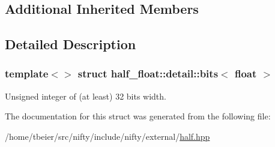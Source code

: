 \subsection*{Additional Inherited Members}


\subsection{Detailed Description}
\subsubsection*{template$<$$>$\newline
struct half\+\_\+float\+::detail\+::bits$<$ float $>$}

Unsigned integer of (at least) 32 bits width. 

The documentation for this struct was generated from the following file\+:\begin{DoxyCompactItemize}
\item 
/home/tbeier/src/nifty/include/nifty/external/\hyperlink{half_8hpp}{half.\+hpp}\end{DoxyCompactItemize}
